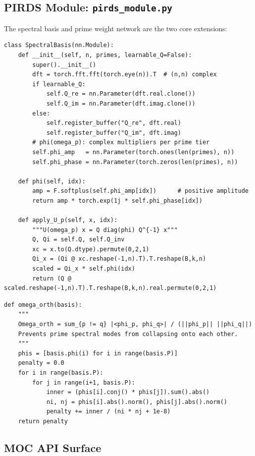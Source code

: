 \documentclass[11pt,a4paper]{article}
\theoremstyle{plain}
\theoremstyle{definition}
\theoremstyle{remark}
\begin{document}
\subsection{PIRDS Module: \texttt{pirds\_module.py}}

The spectral basis and prime weight network are the two core extensions:

\begin{lstlisting}[caption={SpectralBasis: $U(\omega_p) = Q\,\mathrm{diag}(\varphi(\omega_p))\,Q^{-1}$},label=lst:basis]
class SpectralBasis(nn.Module):
    def __init__(self, n, primes, learnable_Q=False):
        super().__init__()
        dft = torch.fft.fft(torch.eye(n)).T  # (n,n) complex
        if learnable_Q:
            self.Q_re = nn.Parameter(dft.real.clone())
            self.Q_im = nn.Parameter(dft.imag.clone())
        else:
            self.register_buffer("Q_re", dft.real)
            self.register_buffer("Q_im", dft.imag)
        # phi(omega_p): complex multipliers per prime tier
        self.phi_amp   = nn.Parameter(torch.ones(len(primes), n))
        self.phi_phase = nn.Parameter(torch.zeros(len(primes), n))

    def phi(self, idx):
        amp = F.softplus(self.phi_amp[idx])      # positive amplitude
        return amp * torch.exp(1j * self.phi_phase[idx])

    def apply_U_p(self, x, idx):
        """U(omega_p) x = Q diag(phi) Q^{-1} x"""
        Q, Qi = self.Q, self.Q_inv
        xc = x.to(Q.dtype).permute(0,2,1)
        Qi_x = (Qi @ xc.reshape(-1,n).T).T.reshape(B,k,n)
        scaled = Qi_x * self.phi(idx)
        return (Q @ scaled.reshape(-1,n).T).T.reshape(B,k,n).real.permute(0,2,1)
\end{lstlisting}

\begin{lstlisting}[caption={Orthogonality regulariser $\Omega_\mathrm{orth}$},label=lst:orth]
def omega_orth(basis):
    """
    Omega_orth = sum_{p != q} |<phi_p, phi_q>| / (||phi_p|| ||phi_q||)
    Prevents prime spectral modes from collapsing onto each other.
    """
    phis = [basis.phi(i) for i in range(basis.P)]
    penalty = 0.0
    for i in range(basis.P):
        for j in range(i+1, basis.P):
            inner = (phis[i].conj() * phis[j]).sum().abs()
            ni, nj = phis[i].abs().norm(), phis[j].abs().norm()
            penalty += inner / (ni * nj + 1e-8)
    return penalty
\end{lstlisting}

\subsection{MOC API Surface}
\end{document}
